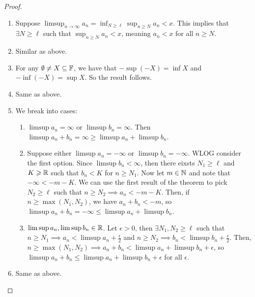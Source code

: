 \documentclass{report}
\begin{document}
\begin{proof}
    \begin{enumerate}
        \item Suppose $\limsup_{n\to\infty}a_n = \inf_{N \geq \ell} \sup_{n\geq N} a_n < x$. This implies that $\exists N \geq \ell$ such that $\sup_{n \geq N} a_n < x$, meaning $a_n < x$ for all $n \geq N$.
        \item Similar as above.
        \item For any $\emptyset \neq X \subseteq \FF$, we have that $-\sup(-X) = \inf X$ and $-\inf(-X) = \sup X$. So the result follows.
        \item Same as above. 
        \item We break into cases:
        \begin{enumerate}
            \item $\limsup a_n = \infty$ or $\limsup b_n = \infty$. Then $\limsup a_n + b_n = \infty  \geq \limsup a_n + \limsup b_n$.
            \item Suppose either $\limsup a_n = -\infty$ or $\limsup b_n = -\infty$. WLOG consider the first option. Since $\limsup b_n < \infty$, then there eixsts $N_1 \geq \ell$ and $K \geq \RR$ such that $b_n < K$ for $n \geq N_1$. Now let $m \in \NN$ and note that $-\infty < -m - K$. We can use the first result of the theorem to pick $N_2 \geq \ell$ such that $n \geq N_2 \implies a_n < -m -K$. Then, if $n \geq \max(N_1, N_2)$, we have $a_n + b_n < -m$, so $\limsup a_n + b_n = -\infty \leq \limsup a_n + \limsup b_n$.
            \item $\limsup a_n, \limsup b_n \in \RR$. Let $\epsilon > 0$, then $\exists N_1, N_2 \geq \ell$ such that $n \geq N_1 \implies a_n < \limsup a_n + \frac{\epsilon}{2}$ and $n \geq N_2 \implies b_n < \limsup b_n + \frac{\epsilon}{2}$. Then, $n \geq \max(N_1, N_2) \implies a_n + b_n < \limsup a_n + \limsup b_n + \epsilon$, so $\limsup a_n + b_n \leq \limsup a_n + \limsup b_n + \epsilon$ for all $\epsilon$.
        \end{enumerate}
        \item Same as above.
    \end{enumerate}
\end{proof}
\end{document}
